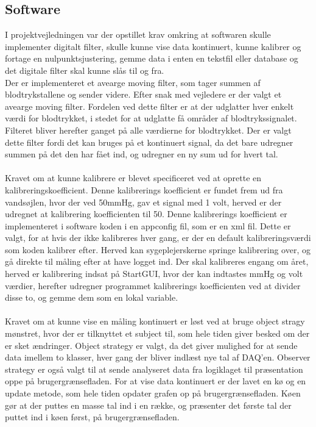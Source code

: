 \subsection{Software}
I projektvejledningen var der opstillet krav omkring at softwaren skulle implementer digitalt filter, skulle kunne vise data kontinuert, kunne kalibrer og fortage en nulpunktsjustering, gemme data i enten en tekstfil eller database og det digitale filter skal kunne slås til og fra. \\
Der er implementeret et avearge moving filter, som tager summen af blodtrykstallene og sender videre. Efter snak med vejledere er der valgt et avearge moving filter. Fordelen ved dette filter er at der udglatter hver enkelt værdi for blodtrykket, i stedet for at udglatte få områder af blodtrykssignalet. Filteret bliver herefter ganget på alle værdierne for blodtrykket. Der er valgt dette filter fordi det kan bruges på et kontinuert signal, da det bare udregner summen på det den har fået ind, og udregner en ny sum ud for hvert tal. \\\\
Kravet om at kunne kalibrere er blevet specificeret ved at oprette en kalibreringskoefficient. Denne kalibrerings koefficient er fundet frem ud fra vandsøjlen, hvor der ved 50mmHg, gav et signal med 1 volt, herved er der udregnet at kalibrering koefficienten til 50. Denne kalibrerings koefficient er implementeret i software koden i en appconfig fil, som er en xml fil. Dette er valgt, for at hvis der ikke kalibreres hver gang, er der en default kalibreringsværdi som koden kalibrer efter. Herved kan sygeplejerskerne springe kalibrering over, og gå direkte til måling efter at have logget ind. Der skal kalibreres engang om året, herved er kalibrering indsat på StartGUI, hvor der kan indtastes mmHg og volt værdier, herefter udregner programmet kalibrerings koefficienten ved at divider disse to, og gemme dem som en lokal variable. \\\\
Kravet om at kunne vise en måling kontinuert er løst ved at bruge object stragy mønstret, hvor der er tilknyttet et subject til, som hele tiden giver besked om der er sket ændringer.  Object strategy er valgt, da det giver mulighed for at sende data imellem to klasser, hver gang der bliver indlæst nye tal af DAQ’en. Observer strategy er også valgt til at sende analyseret data fra logiklaget til præsentation oppe på brugergrænsefladen. For at vise data kontinuert er der lavet en kø og en update metode, som hele tiden opdater grafen op på brugergrænsefladen. Køen gør at der puttes en masse tal ind i en række, og præsenter det første tal der puttet ind i køen først, på brugergrænsefladen. \\\\
